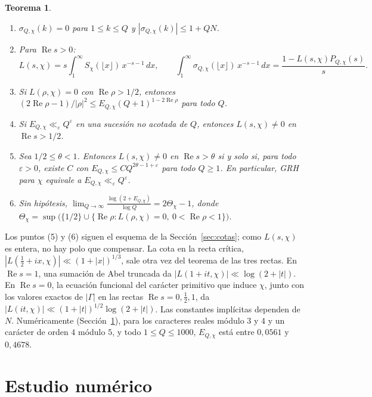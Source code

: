 \documentclass[11pt,a4paper]{amsart}
\newtheorem{teorema}{Teorema}
\theoremstyle{definition}
\theoremstyle{remark}
\renewcommand{\Re}{\operatorname{Re}}
\begin{document}
\begin{teorema}\label{teo:dirichlet}
\begin{enumerate}
\item $\sigma_{Q,\chi}(k)=0$ para $1\le k\le Q$ y $|\sigma_{Q,\chi}(k)|\le1+QN$.
\item Para $\Re s>0$:
\[
L(s,\chi)=s\int_1^\infty S_\chi(\lfloor x\rfloor)\,x^{-s-1}\,dx,\qquad
\int_1^\infty\sigma_{Q,\chi}(\lfloor x\rfloor)\,x^{-s-1}\,dx=\frac{1-L(s,\chi)P_{Q,\chi}(s)}{s}.
\]
\item Si $L(\rho,\chi)=0$ con $\Re\rho>1/2$, entonces $(2\Re\rho-1)/|\rho|^2\le E_{Q,\chi}(Q+1)^{1-2\Re\rho}$ para todo $Q$.
\item Si $E_{Q,\chi}\ll_\varepsilon Q^\varepsilon$ en una sucesi\'on no acotada de $Q$, entonces $L(s,\chi)\ne0$ en $\Re s>1/2$.
\item Sea $1/2\le\theta<1$. Entonces $L(s,\chi)\ne0$ en $\Re s>\theta$ si y solo si, para todo $\varepsilon>0$, existe $C$ con $E_{Q,\chi}\le CQ^{2\theta-1+\varepsilon}$ para todo $Q\ge1$. En particular, GRH para $\chi$ equivale a $E_{Q,\chi}\ll_\varepsilon Q^\varepsilon$.
\item Sin hip\'otesis, $\displaystyle\lim_{Q\to\infty}\frac{\log(2+E_{Q,\chi})}{\log Q}=2\Theta_\chi-1$, donde $\Theta_\chi=\sup\bigl(\{1/2\}\cup\{\Re\rho:L(\rho,\chi)=0,\ 0<\Re\rho<1\}\bigr)$.
\end{enumerate}
\end{teorema}

Los puntos (5) y (6) siguen el esquema de la Secci\'on~\ref{sec:cotas}; como $L(s,\chi)$ es entera, no hay polo que compensar. La cota en la recta cr\'itica, $|L(\tfrac12+ix,\chi)|\ll(1+|x|)^{1/3}$, sale otra vez del teorema de las tres rectas. En $\Re s=1$, una sumaci\'on de Abel truncada da $|L(1+it,\chi)|\ll\log(2+|t|)$. En $\Re s=0$, la ecuaci\'on funcional del car\'acter primitivo que induce $\chi$, junto con los valores exactos de $|\Gamma|$ en las rectas $\Re s=0,\tfrac12,1$, da $|L(it,\chi)|\ll(1+|t|)^{1/2}\log(2+|t|)$. Las constantes impl\'icitas dependen de $N$. Num\'ericamente (Secci\'on~\ref{sec:numerica}), para los caracteres reales m\'odulo $3$ y $4$ y un car\'acter de orden $4$ m\'odulo $5$, y todo $1\le Q\le1000$, $E_{Q,\chi}$ est\'a entre $0{,}0561$ y $0{,}4678$.

\section{Estudio num\'erico}\label{sec:numerica}
\end{document}

